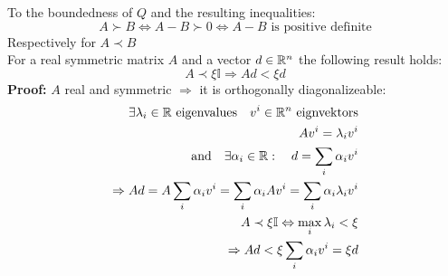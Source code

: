 \begin{remark}
	To the boundedness of \(Q\) and the resulting inequalities:
	\[ A \succ B \Leftrightarrow A - B \succ 0\Leftrightarrow A-B \text{ is positive definite}\]
	Respectively for \(A \prec B\) \\
  For a real symmetric matrix \(A\) and a vector \(d\in \mathbb{R}^n\) the following result holds: 
	\[ A \prec \xi \mathbb{I} \Rightarrow Ad < \xi d \]
	\textbf{Proof:} \(A\) real and symmetric \(\Rightarrow\) it is orthogonally diagonalizeable:
	\begin{equation}
	\begin{split}
		\exists \lambda_i \in \mathbb{R} \text{ eigenvalues} \quad v^i \in \mathbb{R}^n \text{ eignvektors} \\
		Av^i= \lambda_iv^i \\
		\text{and} \quad \exists \alpha_i \in \mathbb{R}: \quad d = \sum_{i} {\alpha_i v^i} \\
		\Rightarrow Ad = A \sum_i{\alpha_i v^i} = \sum_i \alpha_i Av^i = \sum_i \alpha_i \lambda_i v^i\\
		A \prec \xi \mathbb{I}  \Leftrightarrow \max_i \lambda_i < \xi \\
		\Rightarrow Ad < \xi \sum_i \alpha_i v^i = \xi d
  \end{split}
	\end{equation}
\end{remark}












